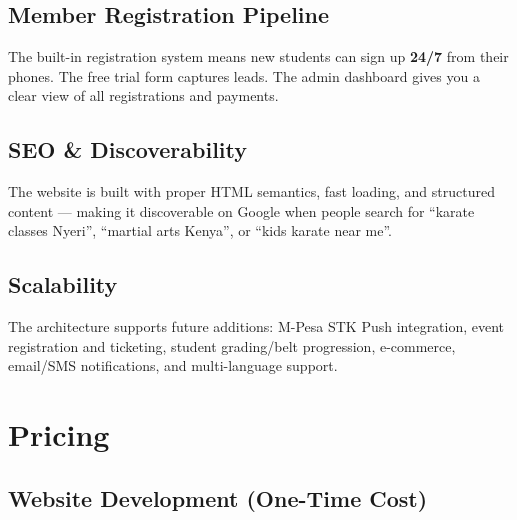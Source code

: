 \documentclass[12pt,a4paper]{article}
\begin{document}
\subsection{Member Registration Pipeline}

The built-in registration system means new students can sign up \textbf{24/7} from their phones. The free trial form captures leads. The admin dashboard gives you a clear view of all registrations and payments.

\subsection{SEO \& Discoverability}

The website is built with proper HTML semantics, fast loading, and structured content --- making it discoverable on Google when people search for ``karate classes Nyeri'', ``martial arts Kenya'', or ``kids karate near me''.

\subsection{Scalability}

The architecture supports future additions: M-Pesa STK Push integration, event registration and ticketing, student grading/belt progression, e-commerce, email/SMS notifications, and multi-language support.

\section{Pricing}

\subsection{Website Development (One-Time Cost)}
\end{document}
